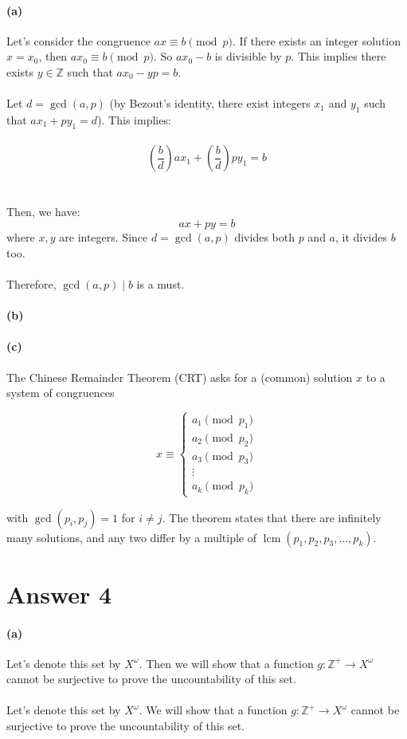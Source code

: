 \documentclass[12pt]{article}
\begin{document}
\paragraph{(a)}
Let's consider the congruence \(ax \equiv b \pmod{p}\). If there exists an integer solution \(x=x_0\), then \(ax_0 \equiv b \pmod{p}\). So \(ax_0 - b\) is divisible by \(p\). This implies there exists \(y \in \mathbb{Z}\) such that \(ax_0 - yp = b\).
\\ \\
Let \(d = \gcd(a, p)\) (by Bezout's identity, there exist integers \(x_1\) and \(y_1\) such that \(ax_1 + py_1 = d\)). This implies: 
\\ \\
\[\left(\frac{b}{d}\right)ax_1 + \left(\frac{b}{d}\right)py_1 = b \]
\\ \\
Then, we have:
\[ ax + py = b \]
where \(x, y\) are integers. Since \(d = \gcd(a, p)\) divides both \(p\) and \(a\), it divides \(b\) too. 
\\ \\
Therefore, \(\gcd(a, p) \mid b\) is a must.

\paragraph{(b)}
\paragraph{(c)}
The Chinese Remainder Theorem (CRT) asks for a (common) solution \(x\) to a system of congruences

\[ x \equiv \begin{cases} a_1 \pmod{p_1} \\ a_2 \pmod{p_2} \\ a_3 \pmod{p_3} \\ \vdots \\ a_k \pmod{p_k} \end{cases} \]

with \(\gcd(p_i, p_j) = 1\) for \(i \neq j\). The theorem states that there are infinitely many solutions, and any two differ by a multiple of \(\operatorname{lcm}(p_1, p_2, p_3, \ldots, p_k)\).


\section*{Answer 4}
\paragraph{(a)}
Let's denote this set by \(X^{\omega}\). Then we will show that a function \(g : \mathbb{Z}^+ \rightarrow X^{\omega}\) cannot be surjective
to prove the uncountability of this set.
\\ \\
Let's denote this set by \(X^\omega\). We will show that a function \(g:\mathbb{Z}^+ \rightarrow X^\omega\) cannot be surjective to prove the uncountability of this set.
\end{document}
